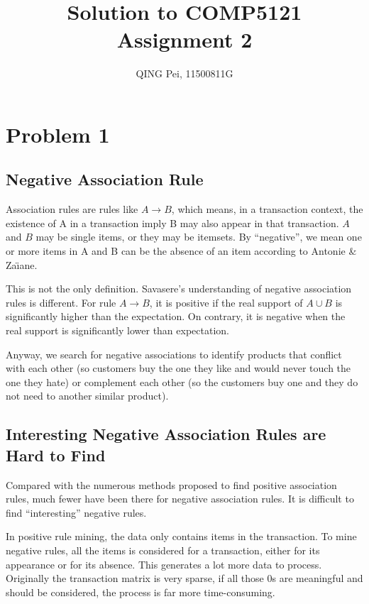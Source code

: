 \documentclass[12pt]{article}
\title{Solution to COMP5121 Assignment 2}
\author{QING Pei, 11500811G}
\begin{document}
\maketitle

\setcounter{tocdepth}{2}
\tableofcontents

\section{Problem 1}
\subsection{Negative Association Rule} %
\label{sub:negative_association_rule}
Association rules are rules like $A\rightarrow B$, which means, in a transaction context, the existence of A in a transaction imply B may also appear in that transaction. $A$ and $B$ may be single items, or they may be itemsets. By ``negative'', we mean one or more items in A and B can be the absence of an item according to Antonie \& Za{\"\i}ane.

This is not the only definition. Savasere's understanding of negative association rules is different. For rule $A\rightarrow B$, it is positive if the real support of $A\cup B$ is significantly higher than the expectation. On contrary, it is negative when the real support is significantly lower than expectation.

Anyway, we search for negative associations to identify products that conflict with each other (so customers buy the one they like and would never touch the one they hate) or complement each other (so the customers buy one and they do not need to another similar product).

\subsection{Interesting Negative Association Rules are Hard to Find} %
\label{sub:interesting_negative_association_rules_are_hard_to_find}
Compared with the numerous methods proposed to find positive association rules, much fewer have been there for negative association rules. It is difficult to find ``interesting'' negative rules.

In positive rule mining, the data only contains items in the transaction. To mine negative rules, all the items is considered for a transaction, either for its appearance or for its absence. This generates a lot more data to process. Originally the transaction matrix is very sparse, if all those 0s are meaningful and should be considered, the process is far more time-consuming.
\end{document}
